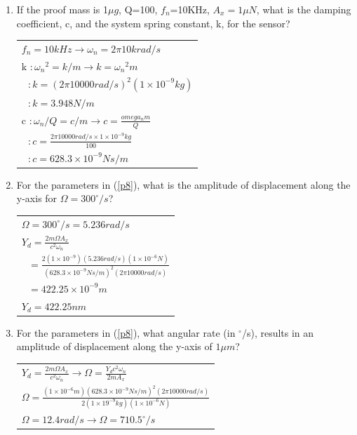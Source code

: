 \documentclass{article}
\begin{document}
\begin{multicols}{2}
\begin{enumerate}
\item\label{p8}
If the proof mass is 1$\mu g$, Q=100, $f_n$=10KHz, $A_x=1\mu N$, 
what is the damping coefficient, c, and the system spring 
constant, k, for the sensor?

\begin{tabular}{ l }
	$f_n = 10kHz \rightarrow \omega_n = 2 \pi 10 k rad/s$\\
	$\text{k }\colon {\omega_n}^2 = k / m \rightarrow k = {\omega_n}^2 m$\\
	$\text{  }\colon k = (2 \pi 10000 rad/s)^2 (1\times 10^{-9} kg)$\\
	$\text{  }\colon k = 3.948 N/m$\\
	$\text{c }\colon \omega_n / Q = c / m \rightarrow c = \frac{omega_n m}{Q}$\\
	$\text{  }\colon c = \frac{2 \pi 10000 rad/s \times 1\times10^{-9} kg}{100}$\\
	$\text{  }\colon c = 628.3 \times 10^{-9} N s /m$
\end{tabular}

\item\label{p9}
For the parameters in (\ref{p8}), what is the amplitude of 
displacement along the y-axis for $\Omega = 300^{\circ}/s$?

\begin{tabular}{ l }
	$\Omega = 300^{\circ}/s = 5.236 rad/s$\\
	$Y_d = \frac{2 m \Omega A_x}{c^2 \omega_n}$\\
	$\text{  }= \frac{2 (1\times10^{-9}) (5.236 rad/s) (1\times 10^{-6} N)}
		{(628.3\times 10^{-9} N s /m)^2 (2 \pi 10000 rad/s)}$\\
	$\text{  }= 422.25 \times 10^{-9} m$\\
	$Y_d = 422.25 nm$
\end{tabular}

\item\label{p10}
For the parameters in (\ref{p8}), what angular rate (in 
$^{\circ}$/s), results in an amplitude of displacement along the
y-axis of $1\mu m$?

\begin{tabular}{ l }
	$Y_d = \frac{2 m \Omega A_x}{c^2 \omega_n} \rightarrow
		\Omega = \frac{Y_d c^2 \omega_n}{2 m A_x}$\\
	$\Omega = \frac{(1\times10^{-6}m)(628.3 \times 10^{-9}N s/m)^2(2\pi 10000 rad/s)}
		{2 (1\times19^{-9} kg)(1\times10^{-6}N)}$\\
	$\Omega = 12.4 rad/s \rightarrow \Omega = 710.5^{\circ}/s$
\end{tabular}

\end{enumerate}
\end{multicols}


\label{end}
\end{document}
